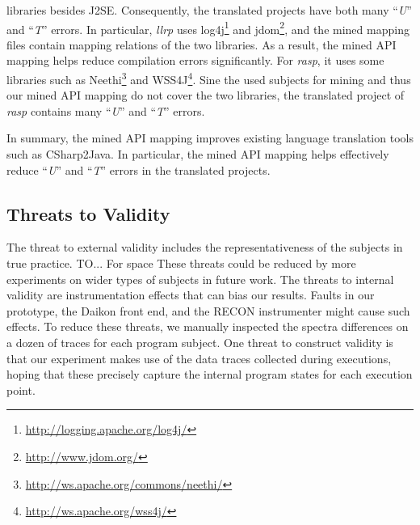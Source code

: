libraries besides J2SE. Consequently, the translated projects have
both many ``\emph{U}'' and ``\emph{T}'' errors. In particular,
\emph{llrp} uses
log4j\footnote{\url{http://logging.apache.org/log4j/}} and
jdom\footnote{\url{http://www.jdom.org/}}, and the mined mapping
files contain mapping relations of the two libraries. As a result,
the mined API mapping helps reduce compilation errors significantly.
For \emph{rasp}, it uses some libraries such as
Neethi\footnote{\url{http://ws.apache.org/commons/neethi/}} and
WSS4J\footnote{\url{http://ws.apache.org/wss4j/}}. Sine the used
subjects for mining and thus our mined API mapping do not cover the
two libraries, the translated project of \emph{rasp} contains many
``\emph{U}'' and ``\emph{T}'' errors.

In summary, the mined API mapping improves existing language
translation tools such as CSharp2Java. In particular, the mined API
mapping helps effectively reduce ``\emph{U}'' and ``\emph{T}''
errors in the translated projects.


\subsection{Threats to Validity}
\label{sec:evaluation:threats} The threat to external validity
includes the representativeness of the subjects in true practice.
TO... For space These threats could be reduced by more experiments
on wider types of subjects in future work. The threats to internal
validity are instrumentation effects that can bias our results.
Faults in our prototype, the Daikon front end, and the RECON
instrumenter might cause such effects. To reduce these threats, we
manually inspected the spectra differences on a dozen of traces for
each program subject. One threat to construct validity is that our
experiment makes use of the data traces collected during executions,
hoping that these precisely capture the internal program states for
each execution point.
